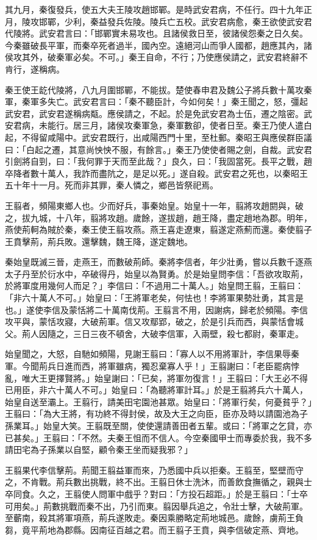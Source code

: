 \begin{pinyinscope}
其九月，秦復發兵，使五大夫王陵攻趙邯鄲。是時武安君病，不任行。四十九年正月，陵攻邯鄲，少利，秦益發兵佐陵。陵兵亡五校。武安君病愈，秦王欲使武安君代陵將。武安君言曰：「邯鄲實未易攻也。且諸侯救日至，彼諸侯怨秦之日久矣。今秦雖破長平軍，而秦卒死者過半，國內空。遠絕河山而爭人國都，趙應其內，諸侯攻其外，破秦軍必矣。不可。」秦王自命，不行；乃使應侯請之，武安君終辭不肯行，遂稱病。

秦王使王龁代陵將，八九月圍邯鄲，不能拔。楚使春申君及魏公子將兵數十萬攻秦軍，秦軍多失亡。武安君言曰：「秦不聽臣計，今如何矣！」秦王聞之，怒，彊起武安君，武安君遂稱病甐。應侯請之，不起。於是免武安君為士伍，遷之陰密。武安君病，未能行。居三月，諸侯攻秦軍急，秦軍數卻，使者日至。秦王乃使人遣白起，不得留咸陽中。武安君既行，出咸陽西門十里，至杜郵。秦昭王與應侯群臣議曰：「白起之遷，其意尚怏怏不服，有餘言。」秦王乃使使者賜之劍，自裁。武安君引劍將自剄，曰：「我何罪于天而至此哉？」良久，曰：「我固當死。長平之戰，趙卒降者數十萬人，我詐而盡阬之，是足以死。」遂自殺。武安君之死也，以秦昭王五十年十一月。死而非其罪，秦人憐之，鄉邑皆祭祀焉。

王翦者，頻陽東鄉人也。少而好兵，事秦始皇。始皇十一年，翦將攻趙閼與，破之，拔九城，十八年，翦將攻趙。歲餘，遂拔趙，趙王降，盡定趙地為郡。明年，燕使荊軻為賊於秦，秦王使王翦攻燕。燕王喜走遼東，翦遂定燕薊而還。秦使翦子王賁擊荊，荊兵敗。還擊魏，魏王降，遂定魏地。

秦始皇既滅三晉，走燕王，而數破荊師。秦將李信者，年少壯勇，嘗以兵數千逐燕太子丹至於衍水中，卒破得丹，始皇以為賢勇。於是始皇問李信：「吾欲攻取荊，於將軍度用幾何人而足？」李信曰：「不過用二十萬人。」始皇問王翦，王翦曰：「非六十萬人不可。」始皇曰：「王將軍老矣，何怯也！李將軍果勢壯勇，其言是也。」遂使李信及蒙恬將二十萬南伐荊。王翦言不用，因謝病，歸老於頻陽。李信攻平與，蒙恬攻寢，大破荊軍。信又攻鄢郢，破之，於是引兵而西，與蒙恬會城父。荊人因隨之，三日三夜不頓舍，大破李信軍，入兩壁，殺七都尉，秦軍走。

始皇聞之，大怒，自馳如頻陽，見謝王翦曰：「寡人以不用將軍計，李信果辱秦軍。今聞荊兵日進而西，將軍雖病，獨忍棄寡人乎！」王翦謝曰：「老臣罷病悖亂，唯大王更擇賢將。」始皇謝曰：「已矣，將軍勿復言！」王翦曰：「大王必不得已用臣，非六十萬人不可。」始皇曰：「為聽將軍計耳。」於是王翦將兵六十萬人，始皇自送至灞上。王翦行，請美田宅園池甚眾。始皇曰：「將軍行矣，何憂貧乎？」王翦曰：「為大王將，有功終不得封侯，故及大王之向臣，臣亦及時以請園池為子孫業耳。」始皇大笑。王翦既至關，使使還請善田者五輩。或曰：「將軍之乞貸，亦已甚矣。」王翦曰：「不然。夫秦王怚而不信人。今空秦國甲士而專委於我，我不多請田宅為子孫業以自堅，顧令秦王坐而疑我邪？」

王翦果代李信擊荊。荊聞王翦益軍而來，乃悉國中兵以拒秦。王翦至，堅壁而守之，不肯戰。荊兵數出挑戰，終不出。王翦日休士洗沐，而善飲食撫循之，親與士卒同食。久之，王翦使人問軍中戲乎？對曰：「方投石超距。」於是王翦曰：「士卒可用矣。」荊數挑戰而秦不出，乃引而東。翦因舉兵追之，令壯士擊，大破荊軍。至蘄南，殺其將軍項燕，荊兵遂敗走。秦因乘勝略定荊地城邑。歲餘，虜荊王負芻，竟平荊地為郡縣。因南征百越之君。而王翦子王賁，與李信破定燕、齊地。


\end{pinyinscope}
